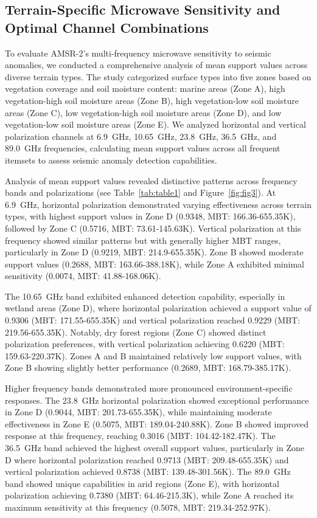 \documentclass[preprint,review,12pt,authoryear]{elsarticle}
\begin{document}
\subsection{Terrain-Specific Microwave Sensitivity and Optimal Channel Combinations}
To evaluate AMSR-2's multi-frequency microwave sensitivity to seismic anomalies, we conducted a comprehensive analysis of mean support values across diverse terrain types. The study categorized surface types into five zones based on vegetation coverage and soil moisture content: marine areas (Zone A), high vegetation-high soil moisture areas (Zone B), high vegetation-low soil moisture areas (Zone C), low vegetation-high soil moisture areas (Zone D), and low vegetation-low soil moisture areas (Zone E). We analyzed horizontal and vertical polarization channels at 6.9~GHz, 10.65~GHz, 23.8~GHz, 36.5~GHz, and 89.0~GHz frequencies, calculating mean support values across all frequent itemsets to assess seismic anomaly detection capabilities.

Analysis of mean support values revealed distinctive patterns across frequency bands and polarizations (see Table~\ref{tab:table1} and Figure~\ref{fig:fig3}). At 6.9~GHz, horizontal polarization demonstrated varying effectiveness across terrain types, with highest support values in Zone D (0.9348, MBT: 166.36-655.35K), followed by Zone C (0.5716, MBT: 73.61-145.63K). Vertical polarization at this frequency showed similar patterns but with generally higher MBT ranges, particularly in Zone D (0.9219, MBT: 214.9-655.35K). Zone B showed moderate support values (0.2688, MBT: 163.66-388.18K), while Zone A exhibited minimal sensitivity (0.0074, MBT: 41.88-168.06K).

The 10.65~GHz band exhibited enhanced detection capability, especially in wetland areas (Zone D), where horizontal polarization achieved a support value of 0.9306 (MBT: 171.55-655.35K) and vertical polarization reached 0.9229 (MBT: 219.56-655.35K). Notably, dry forest regions (Zone C) showed distinct polarization preferences, with vertical polarization achieving 0.6220 (MBT: 159.63-220.37K). Zones A and B maintained relatively low support values, with Zone B showing slightly better performance (0.2689, MBT: 168.79-385.17K).

Higher frequency bands demonstrated more pronounced environment-specific responses. The 23.8~GHz horizontal polarization showed exceptional performance in Zone D (0.9044, MBT: 201.73-655.35K), while maintaining moderate effectiveness in Zone E (0.5075, MBT: 189.04-240.88K). Zone B showed improved response at this frequency, reaching 0.3016 (MBT: 104.42-182.47K). The 36.5~GHz band achieved the highest overall support values, particularly in Zone D where horizontal polarization reached 0.9713 (MBT: 209.48-655.35K) and vertical polarization achieved 0.8738 (MBT: 139.48-301.56K). The 89.0~GHz band showed unique capabilities in arid regions (Zone E), with horizontal polarization achieving 0.7380 (MBT: 64.46-215.3K), while Zone A reached its maximum sensitivity at this frequency (0.5078, MBT: 219.34-252.97K).
\end{document}
